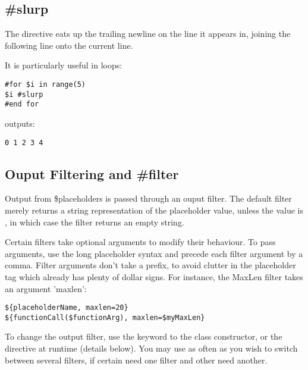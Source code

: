 

\subsection{\#slurp}
\label{output.slurp}

The  directive eats up the trailing newline on the line it
appears in, joining the following line onto the current line.


It is particularly useful in  loops:
\begin{verbatim}
#for $i in range(5)
$i #slurp
#end for
\end{verbatim}
outputs:
\begin{verbatim}
0 1 2 3 4
\end{verbatim}


\subsection{Ouput Filtering and \#filter}
\label{output.filter}

Output from \$placeholders is passed through an ouput filter.  The default
filter merely returns a string representation of the placeholder value,
unless the value is , in which case the filter returns an empty
string. 

Certain filters take optional arguments to modify their behaviour.  To pass
arguments, use the long placeholder syntax and precede each filter argument by
a comma.  Filter arguments don't take a \code{\$} prefix, to avoid clutter in
the placeholder tag which already has plenty of dollar signs.  For instance,
the MaxLen filter takes an argument 'maxlen':

\begin{verbatim}
${placeholderName, maxlen=20}
${functionCall($functionArg), maxlen=$myMaxLen}
\end{verbatim}

To change the output filter, use the  keyword to the
 class constructor, or the 
directive at runtime (details below).  You may use  as often as
you wish to switch between several filters, if certain 
need one filter and other  need another.


